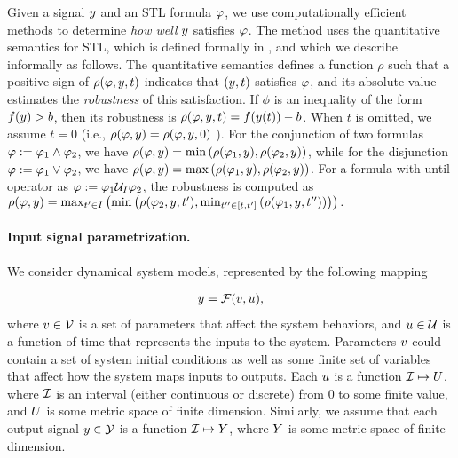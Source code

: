 Given a signal $y$ and an STL formula $\varphi$, we use computationally efficient methods to determine \emph{how well} $y$ satisfies $\varphi$.
The method uses the quantitative semantics for STL, which 
is defined formally in \cite{DonzeM10}, and which we describe informally as follows. The
quantitative semantics defines a function $\rho$ such that a positive sign of
$\rho(\varphi,y,t)$ indicates that $(y,t)$ satisfies
$\varphi$, and its absolute value estimates the \emph{robustness} of
this satisfaction. If $\phi$ is an inequality of the form
$f(y)>b$, then its robustness is $\rho(\varphi,y,t) = f(y(t))-b$.  
When $t$ is omitted, we assume $t=0$ (i.e., $\rho(\varphi,y)=\rho(\varphi,y,0)$ ).
For the conjunction of two
formulas $\varphi := \varphi_1 \wedge \varphi_2$, we have
$\rho(\varphi,y)=\min \left( \rho(\varphi_1,y),\rho(\varphi_2,y)\right)$,
while for the disjunction $\varphi := \varphi_1 \vee \varphi_2$, we have
$\rho(\varphi,y)=\max\left(\rho(\varphi_1,y),\rho(\varphi_2,y)\right)$.
For a formula with until operator as $\varphi := \varphi_1 \mathcal{U}_I \varphi_2$,
the robustness is computed as $\rho(\varphi,y) = \max_{t^\prime\in
  I}\left(\min\left(\rho(\varphi_2,y,t^\prime),\min_{t^{\prime\prime}\in
  [t,t^\prime]}\left(\rho(\varphi_1,y,t^{\prime\prime})\right)\right)\right).$

\paragraph{Input signal parametrization.} We consider dynamical system models, represented by the following mapping

\begin{eqnarray}
y = \mathcal{F} (v, u),
\end{eqnarray}
where $v \in \mathcal{V}$ is a set of parameters that affect the system behaviors, and $u \in \mathcal{U}$ is a function of time that represents the inputs to the system.
Parameters $v$ could contain a set of system initial conditions as well as some finite set of variables that affect how the system maps inputs to outputs.
Each $u$ is a function $\mathcal{I} \mapsto U$, where $\mathcal{I}$ is an interval (either continuous or discrete) from $0$ to some finite value, and $U$ is some metric space of finite dimension.
Similarly, we assume that each output signal $y \in \mathcal{Y}$ is a function $\mathcal{I} \mapsto Y$, where $Y$ is some metric space of finite dimension.

